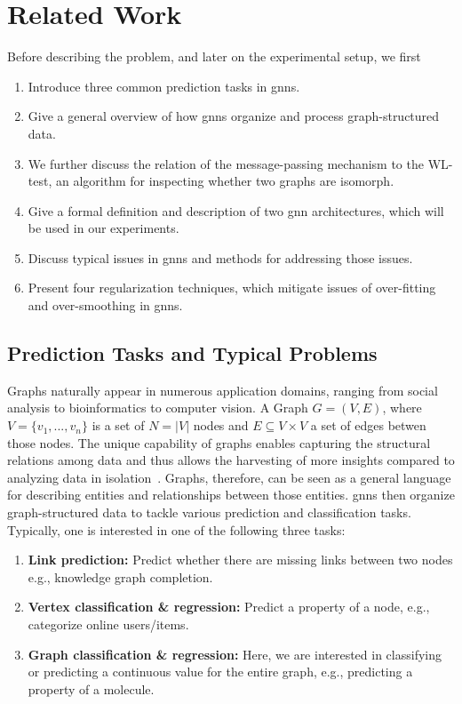 %
\chapter{Related Work}
\label{sec:related}

Before describing the problem, and later on the experimental setup, we first
\begin{enumerate}
    \item Introduce three common prediction tasks in \acp{gnn}.
    \item Give a general overview of how \acp{gnn} organize and process graph-structured data.
    \item We further discuss the relation of the message-passing mechanism to the WL-test, an algorithm for
          inspecting whether two graphs are isomorph.
    \item Give a formal definition and description of two \ac{gnn}
          architectures, which will be used in our experiments.
    \item Discuss typical issues in \acp{gnn} and methods for addressing those issues.
    \item Present four regularization techniques, which mitigate issues of over-fitting and over-smoothing in \acp{gnn}.
\end{enumerate}

\section{Prediction Tasks and Typical Problems}
\label{sec:related:pred}

Graphs naturally appear in numerous application domains, ranging from social analysis to bioinformatics to computer vision.
A Graph $G = (V,E)$, where $V = \{v_{1},...,v_{n}\}$ is a set of $N =|V|$ nodes and $E \subseteq V\times V$ a set of edges betwen those nodes. The unique capability of graphs enables capturing the structural relations among data and thus allows the harvesting of more insights compared to analyzing data in isolation~\cite{Zhang19}. Graphs, therefore, can be seen as a general language for describing entities and relationships between those entities.
\Acfp{gnn} then organize graph-structured data to tackle various prediction and classification
tasks. Typically, one is interested in one of the following three tasks:
\begin{enumerate}[label=\textbf{\arabic*.}]
    \item \textbf{Link prediction:}
          Predict whether there are missing links between two nodes
          e.g., knowledge graph completion.

    \item \textbf{Vertex classification \& regression:}
          Predict a property of a node, e.g., categorize online users/items.

    \item \textbf{Graph classification \& regression:}
          Here, we are interested in classifying or predicting a continuous value for
          the entire graph, e.g., predicting a property of a molecule.
\end{enumerate}

